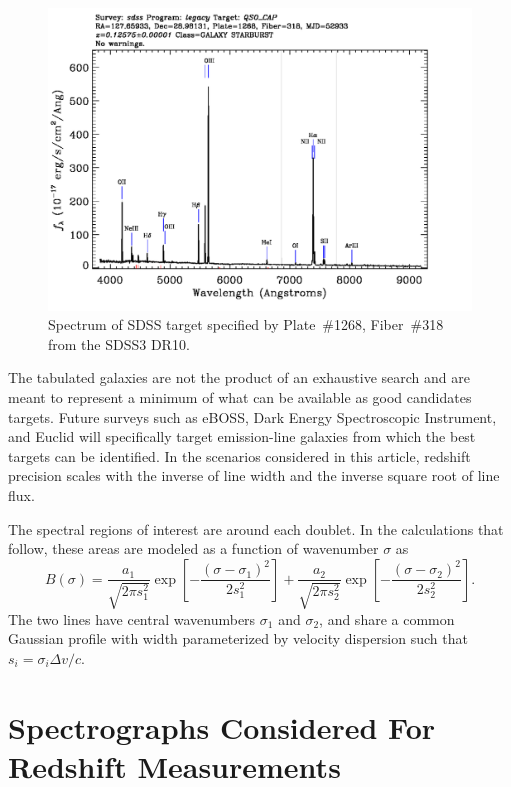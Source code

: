 \documentclass[preprint]{aastex}
\begin{document}
\begin{figure}[t]
   \centering
    \includegraphics[width=\columnwidth]{SpecById.pdf} 
   \caption{Spectrum of SDSS target specified by Plate~\#1268, Fiber~\#318 from the SDSS3 DR10.  \label{shsinput:fig}}
\end{figure}

The tabulated galaxies are not the product of an exhaustive search and are meant to represent a minimum of what can be available
as good
candidates targets.
Future surveys such as eBOSS, Dark Energy Spectroscopic Instrument, and Euclid will specifically target emission-line
galaxies from which the best targets can be identified.  In the scenarios considered in this article, redshift precision scales
with the inverse of line width and the inverse square root of line flux.

The spectral regions of interest
are around each doublet.  In the calculations that follow, these areas are modeled as a function of wavenumber $\sigma$ as
\begin{equation}
B(\sigma)=\frac{a_1}{\sqrt{2\pi s_1^2}}\exp{\left[-\frac{\left(\sigma-\sigma_1\right)^2}{2s_1^2}\right]}+\frac{a_2}{\sqrt{2\pi s_2^2}}\exp{\left[-\frac{\left(\sigma-\sigma_2\right)^2}{2s_2^2}\right]}.
\label{input:eqn}
\end{equation}
The two lines have central wavenumbers $\sigma_1$ and $\sigma_2$, and share a common Gaussian profile with width parameterized by velocity dispersion
such that $s_i=\sigma_i\Delta v/c$. 


\section{Spectrographs Considered For Redshift Measurements} 
\end{document}
